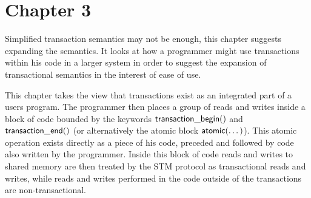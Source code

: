 % 














\section{Chapter 3}
Simplified transaction semantics may not be enough,
this chapter suggests expanding the semantics.
It looks at how a programmer might use transactions
within his code in a larger system in order to suggest the expansion of transactional
semantics in the interest of ease of use.



This chapter takes the view that transactions exist as an integrated part of
a users program.
The programmer then places a group of reads and writes
inside a block of code bounded by the keywords $\act{transaction\_begin}()$ and
$\act{transaction\_end}()$ (or alternatively the atomic block $\act{atomic}(\dots)$).
This atomic operation exists directly as a piece of his code, preceded
and followed by code also written by the programmer.
Inside this block of code reads and writes to shared memory are then
treated by the STM protocol as transactional reads and writes,
while reads and writes performed in the code outside of the transactions
are non-transactional.

